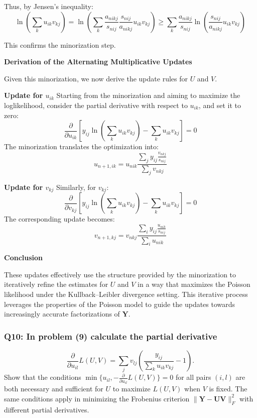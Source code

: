 \documentclass[8pt]{article}
\begin{document}
{Thus, by Jensen's inequality:
\[
\ln \left( \sum_k u_{ik}v_{kj} \right) = \ln \left( \sum_k \frac{a_{nikj}}{s_{nij}} \frac{s_{nij}}{a_{nikj}} u_{ik}v_{kj} \right) \geq \sum_k \frac{a_{nikj}}{s_{nij}} \ln \left( \frac{s_{nij}}{a_{nikj}} u_{ik}v_{kj} \right)
\]

This confirms the minorization step.

\textbf{Derivation of the Alternating Multiplicative Updates}

Given this minorization, we now derive the update rules for \( U \) and \( V \).

\textbf{Update for \( u_{ik} \)}
Starting from the minorization and aiming to maximize the loglikelihood, consider the partial derivative with respect to \( u_{ik} \), and set it to zero:
\[
\frac{\partial}{\partial u_{ik}} \left[ y_{ij} \ln \left( \sum_k u_{ik}v_{kj} \right) - \sum_k u_{ik}v_{kj} \right] = 0
\]
The minorization translates the optimization into:
\[
u_{n+1,ik} = u_{nik} \frac{\sum_j y_{ij} \frac{v_{nkj}}{s_{nij}}}{\sum_j v_{nkj}}
\]

\textbf{Update for \( v_{kj} \)}
Similarly, for \( v_{kj} \):
\[
\frac{\partial}{\partial v_{kj}} \left[ y_{ij} \ln \left( \sum_k u_{ik}v_{kj} \right) - \sum_k u_{ik}v_{kj} \right] = 0
\]
The corresponding update becomes:
\[
v_{n+1,kj} = v_{nkj} \frac{\sum_i y_{ij} \frac{u_{nik}}{s_{nij}}}{\sum_i u_{nik}}
\]

\textbf{Conclusion}

These updates effectively use the structure provided by the minorization to iteratively refine the estimates for \( U \) and \( V \) in a way that maximizes the Poisson likelihood under the Kullback–Leibler divergence setting. This iterative process leverages the properties of the Poisson model to guide the updates towards increasingly accurate factorizations of \( \mathbf{Y} \).

\subsubsection*{Q10: In problem (9) calculate the partial derivative}
\[
\frac{\partial}{\partial u_{il}} L(U, V) = \sum_j v_{lj} \left( \frac{y_{ij}}{\sum_k u_{ik}v_{kj}} - 1 \right).
\]
\noindent Show that the conditions \(\min\{u_{il}, - \frac{\partial}{\partial u_{il}} L(U, V)\} = 0\) for all pairs \((i, l)\) are both necessary and sufficient for \(U\) to maximize \(L(U, V)\) when \(V\) is fixed. The same conditions apply in minimizing the Frobenius criterion \(\|\mathbf{Y} - \mathbf{U} \mathbf{V}\|_F^2\) with different partial derivatives.

}
\end{document}
